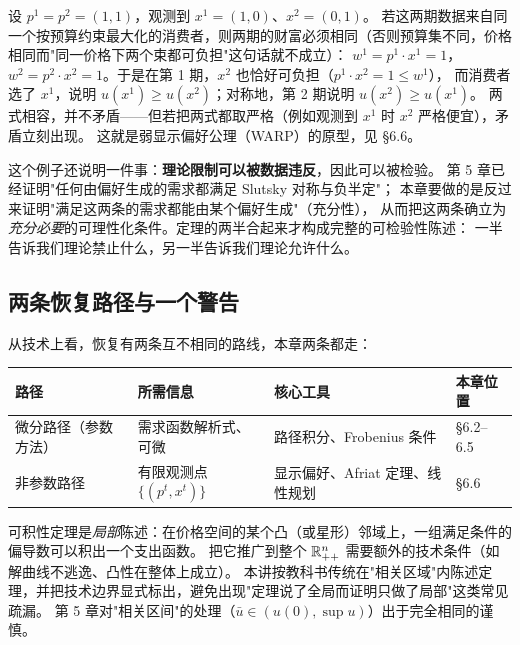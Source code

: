 \begin{example}[同一价格下选两个不同束]\label{ex:twobundles}
设 $p^1=p^2=(1,1)$，观测到 $x^1=(1,0)$、$x^2=(0,1)$。
若这两期数据来自同一个按预算约束最大化的消费者，则两期的财富必须相同（否则预算集不同，价格相同而"同一价格下两个束都可负担"这句话就不成立）：
$w^1=p^1\cdot x^1=1$，$w^2=p^2\cdot x^2=1$。于是在第 1 期，$x^2$ 也恰好可负担（$p^1\cdot x^2=1\le w^1$），
而消费者选了 $x^1$，说明 $u(x^1)\ge u(x^2)$；对称地，第 2 期说明 $u(x^2)\ge u(x^1)$。
两式相容，并不矛盾——但若把两式都取严格（例如观测到 $x^1$ 时 $x^2$ 严格便宜），矛盾立刻出现。
这就是弱显示偏好公理（WARP）的原型，见 \S 6.6。
\end{example}

这个例子还说明一件事：\textbf{理论限制可以被数据违反}，因此可以被检验。
第 5 章已经证明"任何由偏好生成的需求都满足 Slutsky 对称与负半定"；
本章要做的是反过来证明"满足这两条的需求都能由某个偏好生成"（充分性），
从而把这两条确立为\emph{充分必要}的可理性化条件。定理的两半合起来才构成完整的可检验性陈述：
一半告诉我们理论禁止什么，另一半告诉我们理论允许什么。

\subsection{两条恢复路径与一个警告}

从技术上看，恢复有两条互不相同的路线，本章两条都走：

\begin{center}
\footnotesize
\begin{tabular}{l>{\raggedright\arraybackslash}p{3.7cm}>{\raggedright\arraybackslash}p{5.4cm}l}
\toprule
路径 & 所需信息 & 核心工具 & 本章位置\\
\midrule
微分路径（参数方法） & 需求函数解析式、可微 & 路径积分、Frobenius 条件 & \S 6.2--6.5\\
非参数路径 & 有限观测点 $\{(p^t,x^t)\}$ & 显示偏好、Afriat 定理、线性规划 & \S 6.6\\
\bottomrule
\end{tabular}
\end{center}

\begin{remark}
可积性定理是\emph{局部}陈述：在价格空间的某个凸（或星形）邻域上，一组满足条件的偏导数可以积出一个支出函数。
把它推广到整个 $\mathbb{R}^n_{++}$ 需要额外的技术条件（如解曲线不逃逸、凸性在整体上成立）。
本讲按教科书传统在"相关区域"内陈述定理，并把技术边界显式标出，避免出现"定理说了全局而证明只做了局部"这类常见疏漏。
第 5 章对"相关区间"的处理（$\bar u\in(u(0),\sup u)$）出于完全相同的谨慎。
\end{remark}


